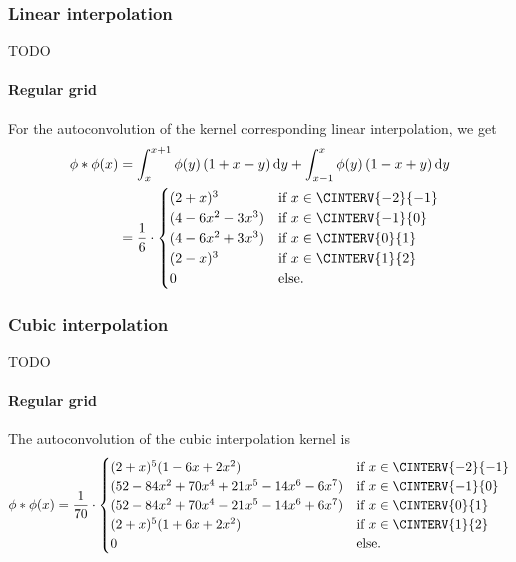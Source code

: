 \documentclass[a4paper]{paper}
\newcommand*{\D}{{\ensuremath{\mathrm{d}}}}
\begin{document}
\subsubsection{Linear interpolation}
\label{subsubsec:specif:conv:linear}

TODO

\paragraph{Regular grid}

For the autoconvolution of the kernel corresponding linear interpolation, we get
%
\begin{align*}
 \phi \ast \phi(x) 
 &= \int_x^{x+1} \phi(y)\, (1+x-y)\, \D y + \int_{x-1}^x \phi(y)\, (1-x+y)\, \D y \\
 &= \frac{1}{6}\cdot 
 \begin{cases}
  (2+x)^3 & \text{if } x \in \CINTERV{-2}{-1} \\
  (4 - 6x^2 - 3x^3) & \text{if } x \in \CINTERV{-1}{0} \\
  (4 - 6x^2 + 3x^3) & \text{if } x \in \CINTERV{0}{1} \\
  (2-x)^3 & \text{if } x \in \CINTERV{1}{2} \\
  0 & \text{else}.
 \end{cases}
\end{align*}


\subsubsection{Cubic interpolation}
\label{subsubsec:specif:conv:cubic}

TODO

\paragraph{Regular grid}

The autoconvolution of the cubic interpolation kernel is 
%
\begin{equation*}
 \phi \ast \phi(x) = \frac{1}{70} \cdot
 \begin{cases}
  (2+x)^5 (1-6x+2x^2) & \text{if } x \in \CINTERV{-2}{-1} \\
  (52 - 84x^2 + 70x^4 + 21x^5 -14x^6 - 6x^7) & \text{if } x \in \CINTERV{-1}{0} \\
  (52 - 84x^2 + 70x^4 - 21x^5 -14x^6 + 6x^7) & \text{if } x \in \CINTERV{0}{1} \\
  (2+x)^5 (1+6x+2x^2) & \text{if } x \in \CINTERV{1}{2} \\
  0 & \text{else}.
 \end{cases}
\end{equation*}
\end{document}
